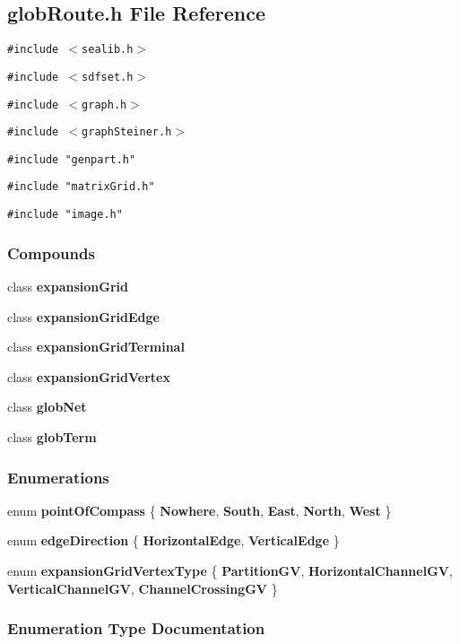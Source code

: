 \subsection{glob\-Route.h File Reference}
\label{globRoute.h}
{\tt \#include $<$sealib.h$>$}\par
{\tt \#include $<$sdfset.h$>$}\par
{\tt \#include $<$graph.h$>$}\par
{\tt \#include $<$graph\-Steiner.h$>$}\par
{\tt \#include "genpart.h"}\par
{\tt \#include "matrix\-Grid.h"}\par
{\tt \#include "image.h"}\par
\subsubsection*{Compounds}
\begin{CompactItemize}
\item 
class {\bf expansion\-Grid}
\item 
class {\bf expansion\-Grid\-Edge}
\item 
class {\bf expansion\-Grid\-Terminal}
\item 
class {\bf expansion\-Grid\-Vertex}
\item 
class {\bf glob\-Net}
\item 
class {\bf glob\-Term}
\end{CompactItemize}
\subsubsection*{Enumerations}
\begin{CompactItemize}
\item 
enum {\bf point\-Of\-Compass} \{ {\bf Nowhere}, 
{\bf South}, 
{\bf East}, 
{\bf North}, 
{\bf West}
 \}
\item 
enum {\bf edge\-Direction} \{ {\bf Horizontal\-Edge}, 
{\bf Vertical\-Edge}
 \}
\item 
enum {\bf expansion\-Grid\-Vertex\-Type} \{ {\bf Partition\-GV}, 
{\bf Horizontal\-Channel\-GV}, 
{\bf Vertical\-Channel\-GV}, 
{\bf Channel\-Crossing\-GV}
 \}
\end{CompactItemize}


\subsubsection{Enumeration Type Documentation}
\label{globRoute.h_a12}
